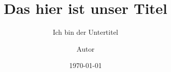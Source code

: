 \documentclass[12pt, a4paper]{scrartcl}         %
\begin{document}

    \title{Das hier ist unser Titel}                %
    \subtitle{Ich bin der Untertitel}               %
    \author{Autor}                                  %
    \publishers{Herausgeber}                        %
    \date{\today}                                   %


    \maketitle                                      %

    \blinddocument
\end{document}
